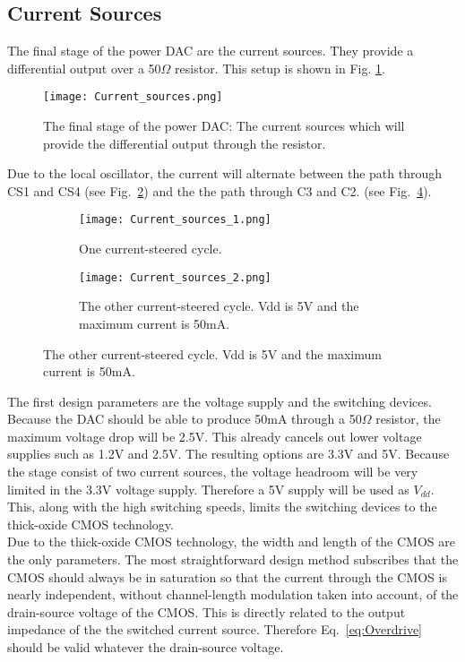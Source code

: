 \subsection{Current Sources}\label{sec:currentsources}
The final stage of the power DAC are the current sources. They provide a differential output over a 50$\Omega$ resistor. This setup is shown in Fig. \ref{figure:Current_sources}.
\begin{figure}[h!]
\begin{center}
\texttt{[image: Current\_sources.png]}
\caption{The final stage of the power DAC: The current sources which will provide the differential output through the resistor.}
\label{figure:Current_sources}
\end{center}
\end{figure}
Due to the local oscillator, the current will alternate between the path through CS1 and CS4 (see Fig.~\ref{fig:CS1CS4}) and the the path through C3 and C2. (see Fig.~\ref{fig:CS3CS2}). 
\begin{figure}
\centering
\begin{subfigure}{0.5\textwidth}
\centering
\texttt{[image: Current\_sources\_1.png]}
\caption{One current-steered cycle.}
\label{fig:CS1CS4}
\end{subfigure}
\begin{subfigure}{0.5\textwidth}
\centering
\texttt{[image: Current\_sources\_2.png]}
\caption{The other current-steered cycle. Vdd is 5V and the maximum current is 50mA.}
\label{fig:CS3CS2}
\end{subfigure}
\end{figure}
The first design parameters are the voltage supply and the switching devices. Because the DAC should be able to produce 50mA through a 50$\Omega$ resistor, the maximum voltage drop will be 2.5V. This already cancels out lower voltage supplies such as 1.2V and 2.5V. The resulting options are 3.3V and 5V. Because the stage consist of two current sources, the voltage headroom will be very limited in the 3.3V voltage supply. Therefore a 5V supply will be used as $V_{dd}$. This, along with the high switching speeds, limits the switching devices to the thick-oxide CMOS technology.\\
Due to the thick-oxide CMOS technology, the width and length of the CMOS are the only parameters. The most straightforward design method subscribes that the CMOS should always be in saturation so that the current through the CMOS is nearly independent, without channel-length modulation taken into account, of the drain-source voltage of the CMOS. This is directly related to the output impedance of the the switched current source. Therefore Eq.~\ref{eq:Overdrive} should be valid whatever the drain-source voltage.\\

